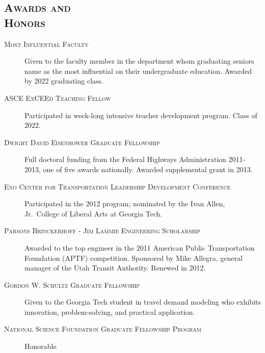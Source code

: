 \documentclass[margin,line]{res}
\newcommand{\secfont}{\scshape }
\newcommand{\acc}{\scshape }
\begin{document}
\begin{resume}
%



\noindent\makebox[\linewidth]{\rule{\linewidth}{0.4pt}}
\section{\secfont Awards and\\ Honors}
\begin{description}
\item[\acc Most Influential Faculty] Given to the faculty member in the department
whom graduating seniors name as the most influential on their undergraduate
education. Awarded by 2022 graduating class.
\item[\acc ASCE ExCEEd Teaching Fellow] Participated in week-long intensive teacher
development program. Class of 2022.
\item[\acc Dwight David Eisenhower Graduate Fellowship] Full doctoral funding from
the Federal Highways Administration 2011-2013, one of five awards nationally.
Awarded supplemental grant in 2013.
\item[\acc Eno Center for Transportation Leadership Development Conference]
Participated in the 2012 program; nominated by the Ivan Allen, Jr.\ College of
Liberal Arts at Georgia Tech.
\item[\acc Parsons Brinckerhoff - Jim Lammie Engineering Scholarship] Awarded
 to the top engineer in the 2011 American Public Transportation Foundation (APTF)
competition. Sponsored by Mike Allegra, general manager of the Utah Transit
Authority. Renewed in 2012.
\item[\acc Gordon W. Schultz Graduate Fellowship] Given to the Georgia Tech
student in travel demand modeling who exhibits innovation, problem-solving, and
practical application.
\item[\acc National Science Foundation Graduate Fellowship Program] Honorable

\end{description}
\end{resume}
\end{document}

